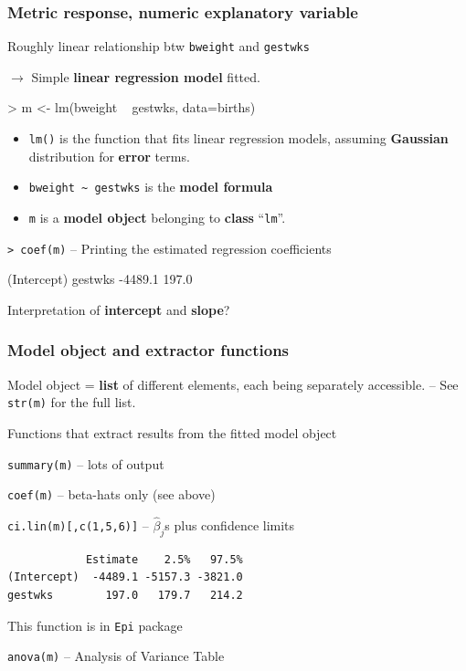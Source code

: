 \documentclass[12pt,dvipsnames,t,handout%
,aspectratio=169%
]{beamer}
\begin{document}
\begin{frame}[fragile]\frametitle{Metric response, numeric explanatory variable}

Roughly linear relationship btw \texttt{bweight}
and \texttt{gestwks} 

$\to$ 
 Simple {\bf linear regression model} fitted.
\begin{semiverbatim}
> m <- lm(bweight ~ gestwks, data=births)
\end{semiverbatim}
\begin{itemize}
\item \texttt{lm()} is the function that fits linear regression models,
assuming {\bf Gaussian} distribution for {\bf error} terms.
\medskip
\item \verb+bweight ~ gestwks+ is the {\bf model formula}
\medskip
\item \texttt{m} is a {\bf model object} belonging to {\bf class} ``{\tt lm}''.
\end{itemize}

\medskip

\verb|> coef(m)| -- Printing the estimated regression coefficients
{\small
\begin{semiverbatim}
(Intercept)     gestwks 
    -4489.1       197.0 
\end{semiverbatim}
}
Interpretation of {\bf intercept} and {\bf slope}?
\vfill
\end{frame}


\begin{frame}[fragile]\frametitle{Model object and extractor functions}

Model object = {\bf list} of different elements, each being
separately accessible. -- See \texttt{str(m)} for the full list.

\medskip
Functions that extract results from the fitted model object

\bi
\item
 \verb|summary(m)| -- lots of output
\medskip
\item
\verb|coef(m)| -- beta-hats only (see above)
\medskip
\item
\verb|ci.lin(m)[,c(1,5,6)]| -- $\widehat\beta_j$s plus confidence limits 
{\small
\begin{verbatim}
            Estimate    2.5%   97.5%
(Intercept)  -4489.1 -5157.3 -3821.0
gestwks        197.0   179.7   214.2
\end{verbatim}
}
This function is in {\tt Epi} package
\medskip
\item
\verb|anova(m)| -- Analysis of Variance Table

\ei
\end{frame}
\end{document}
